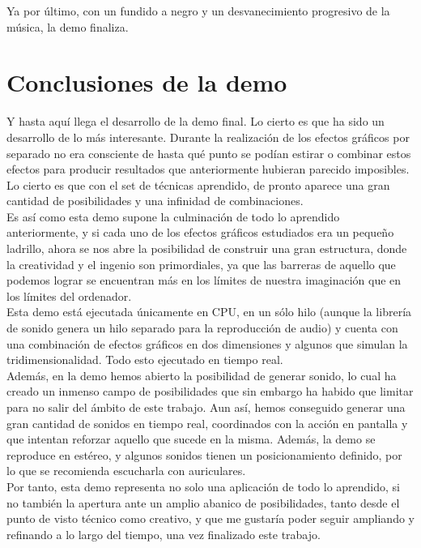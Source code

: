Ya por último, con un fundido a negro y un desvanecimiento progresivo de la música, la demo finaliza.

\section{Conclusiones de la demo}

Y hasta aquí llega el desarrollo de la demo final. Lo cierto es que ha sido un desarrollo de lo más interesante. Durante la realización de los efectos gráficos por separado no era consciente de hasta qué punto se podían estirar o combinar estos efectos para producir resultados que anteriormente hubieran parecido imposibles.\\

Lo cierto es que con el set de técnicas aprendido, de pronto aparece una gran cantidad de posibilidades y una infinidad de combinaciones.\\

Es así como esta demo supone la culminación de todo lo aprendido anteriormente, y si cada uno de los efectos gráficos estudiados era un pequeño ladrillo, ahora se nos abre la posibilidad de construir una gran estructura, donde la creatividad y el ingenio son primordiales, ya que las barreras de aquello que podemos lograr se encuentran más en los límites de nuestra imaginación que en los límites del ordenador.\\

Esta demo está ejecutada únicamente en CPU, en un sólo hilo (aunque la librería de sonido genera un hilo separado para la reproducción de audio) y cuenta con una combinación de efectos gráficos en dos dimensiones y algunos que simulan la tridimensionalidad. Todo esto ejecutado en tiempo real.\\

Además, en la demo hemos abierto la posibilidad de generar sonido, lo cual ha creado un inmenso campo de posibilidades que sin embargo ha habido que limitar para no salir del ámbito de este trabajo. Aun así, hemos conseguido generar una gran cantidad de sonidos en tiempo real, coordinados con la acción en pantalla y que intentan reforzar aquello que sucede en la misma. Además, la demo se reproduce en estéreo, y algunos sonidos tienen un posicionamiento definido, por lo que se recomienda escucharla con auriculares.\\

Por tanto, esta demo representa no solo una aplicación de todo lo aprendido, si no también la apertura ante un amplio abanico de posibilidades, tanto desde el punto de visto técnico como creativo, y que me gustaría poder seguir ampliando y refinando a lo largo del tiempo, una vez finalizado este trabajo.\\
